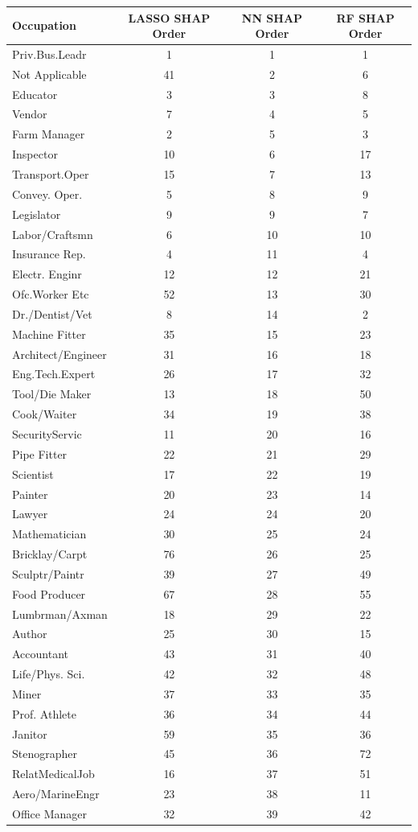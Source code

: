 \begin{tabular}{lccc}
\hline\hline
Occupation & LASSO SHAP Order & NN SHAP Order & RF SHAP Order \\
\hline
Priv.Bus.Leadr&1&1&1\\
Not Applicable&41&2&6\\
Educator&3&3&8\\
Vendor&7&4&5\\
Farm Manager&2&5&3\\
Inspector&10&6&17\\
Transport.Oper&15&7&13\\
Convey. Oper.&5&8&9\\
Legislator&9&9&7\\
Labor/Craftsmn&6&10&10\\
Insurance Rep.&4&11&4\\
Electr. Enginr&12&12&21\\
Ofc.Worker Etc&52&13&30\\
Dr./Dentist/Vet&8&14&2\\
Machine Fitter&35&15&23\\
Architect/Engineer&31&16&18\\
Eng.Tech.Expert&26&17&32\\
Tool/Die Maker&13&18&50\\
Cook/Waiter&34&19&38\\
SecurityServic&11&20&16\\
Pipe Fitter&22&21&29\\
Scientist&17&22&19\\
Painter&20&23&14\\
Lawyer&24&24&20\\
Mathematician&30&25&24\\
Bricklay/Carpt&76&26&25\\
Sculptr/Paintr&39&27&49\\
Food Producer&67&28&55\\
Lumbrman/Axman&18&29&22\\
Author&25&30&15\\
Accountant&43&31&40\\
Life/Phys. Sci.&42&32&48\\
Miner&37&33&35\\
Prof. Athlete&36&34&44\\
Janitor&59&35&36\\
Stenographer&45&36&72\\
RelatMedicalJob&16&37&51\\
Aero/MarineEngr&23&38&11\\
Office Manager&32&39&42\\

\end{tabular}
